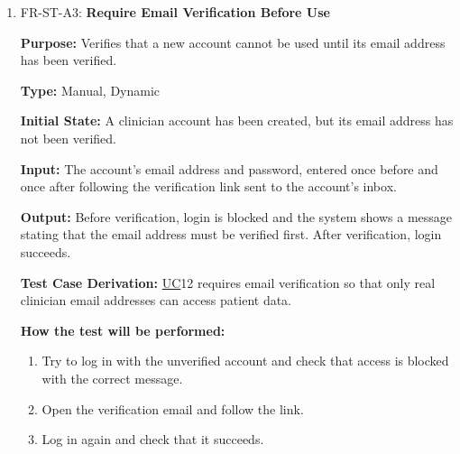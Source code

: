 \documentclass[12pt, titlepage]{article}
\newcommand{\srsuc}[1]{\href{https://github.com/Nour-Fawaz/MacaBoca/blob/main/pdfs/SRS/SRS.pdf}{UC}}
\renewcommand{\_}{\oldunderscore\allowbreak}
\begin{document}
\begin{enumerate}
  \item FR-ST-A3: \textbf{Require Email Verification Before Use\\}
  \begin{mdframed}[linewidth=0.5mm]
      \textbf{Purpose:} Verifies that a new account cannot be used until its email address has been verified. \par
      \textbf{Type:} Manual, Dynamic \par
      \textbf{Initial State:} A clinician account has been created, but its email address has not been verified. \par
      \textbf{Input:} The account's email address and password, entered once before and once after following the verification link sent to the account's inbox. \par
      \textbf{Output:} Before verification, login is blocked and the system shows a message stating that the email address must be verified first. After verification, login succeeds. \par
      \textbf{Test Case Derivation:} \srsuc*{12} requires email verification so that only real clinician email addresses can access patient data. \par
      \textbf{How the test will be performed:}
      \begin{enumerate}
          \item[1.] Try to log in with the unverified account and check that access is blocked with the correct message.
          \item[2.] Open the verification email and follow the link.
          \item[3.] Log in again and check that it succeeds.
      \end{enumerate}
  \end{mdframed}


\end{enumerate}
\end{document}
